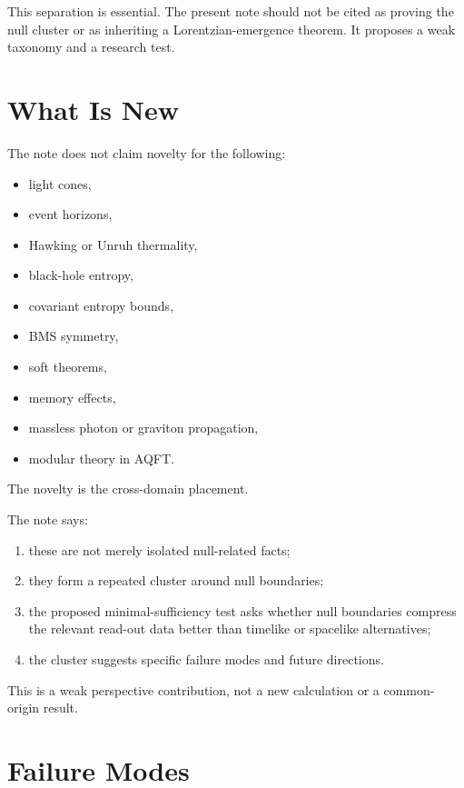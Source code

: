 \documentclass[12pt,a4paper]{article}
\theoremstyle{definition}
\theoremstyle{remark}
\newcommand{\tightlist}{%
  \setlength{\itemsep}{0pt}\setlength{\parskip}{0pt}}
\begin{document}
This separation is essential. The present note should not be cited as
proving the null cluster or as inheriting a Lorentzian-emergence theorem.
It proposes a weak taxonomy and a research test.

\section{What Is New}\label{what-is-new}

The note does not claim novelty for the following:

\begin{itemize}
\tightlist
\item
  light cones,
\item
  event horizons,
\item
  Hawking or Unruh thermality,
\item
  black-hole entropy,
\item
  covariant entropy bounds,
\item
  BMS symmetry,
\item
  soft theorems,
\item
  memory effects,
\item
  massless photon or graviton propagation,
\item
  modular theory in AQFT.
\end{itemize}

The novelty is the cross-domain placement.

The note says:

\begin{enumerate}[leftmargin=*]
\tightlist
\item
  these are not merely isolated null-related facts;
\item
  they form a repeated cluster around null boundaries;
\item
  the proposed minimal-sufficiency test asks whether null boundaries
  compress the relevant read-out data better than timelike or spacelike
  alternatives;
\item
  the cluster suggests specific failure modes and future directions.
\end{enumerate}

This is a weak perspective contribution, not a new calculation or a common-origin result.

\section{Failure Modes}\label{failure-modes}
\end{document}
